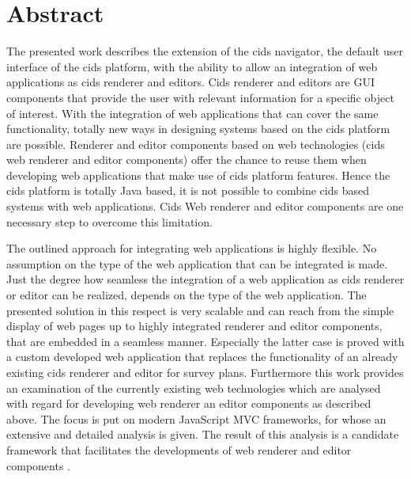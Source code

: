 \chapter*{Abstract}

The presented work describes the extension of the cids navigator, the default user interface of the cids platform, with the ability to allow an integration of web applications as cids renderer and editors. 
Cids renderer and editors are GUI components that provide the user with relevant information for a specific object of interest. 
With the integration of web applications that can cover the same functionality, totally new ways in designing systems based on the cids platform are possible. 
Renderer and editor components based on web technologies (cids web renderer and editor components) offer the chance to reuse them when developing web applications that make use of cids platform features. 
Hence the cids platform is totally Java based, it is not possible to combine cids based systems with web applications. 
Cids Web renderer and editor components are one necessary step to overcome this limitation.

The outlined approach for integrating web applications is highly flexible. 
No assumption on the type of the web application that can be integrated is made. 
Just the degree how seamless the integration of a web application as cids renderer or editor can be realized, depends on the type of the web application. 
The presented solution in this respect is very scalable and can reach from the simple display of web pages up to highly integrated renderer and editor components, that are embedded in a seamless manner. 
Especially the latter case is proved with a custom developed web application that replaces the functionality of an already existing cids renderer and editor for survey plans.
Furthermore this work provides an examination of the currently existing web technologies which are analysed with regard for developing web renderer an editor components as described above. 
The focus is put on modern JavaScript MVC frameworks, for whose an extensive and detailed analysis is given. 
The result of this analysis is a candidate framework that facilitates the developments of web renderer and editor components .


